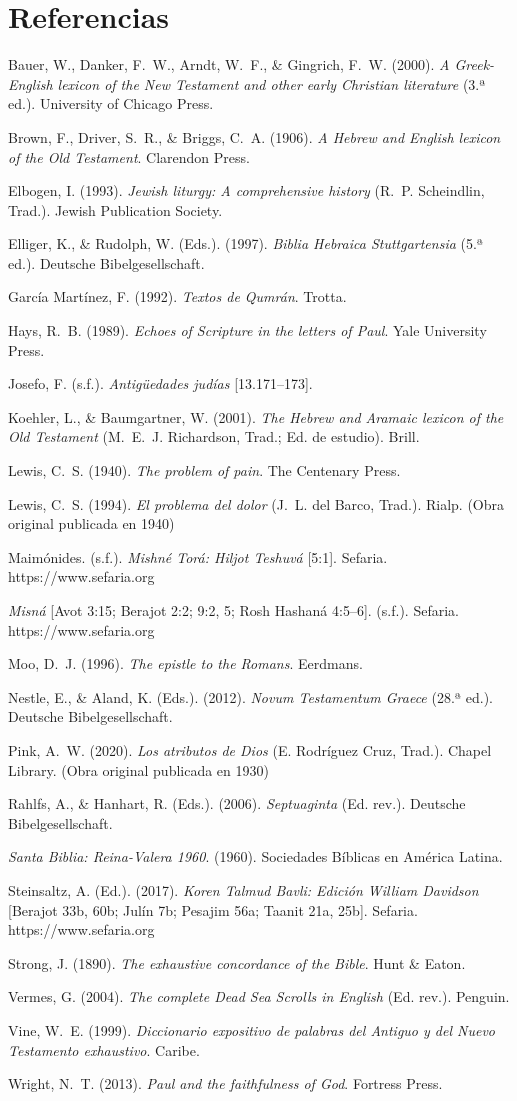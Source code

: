 \documentclass[11pt,letterpaper]{article}
\newcommand{\refapa}[1]{\par{\RaggedRight\hangindent=1.27cm\hangafter=1\noindent #1\par}\vspace{4pt}}
\begin{document}
\section*{Referencias}
\refapa{Bauer, W., Danker, F.~W., Arndt, W.~F., \& Gingrich, F.~W. (2000). \emph{A Greek-English lexicon of the New Testament and other early Christian literature} (3.ª ed.). University of Chicago Press.}
\refapa{Brown, F., Driver, S.~R., \& Briggs, C.~A. (1906). \emph{A Hebrew and English lexicon of the Old Testament}. Clarendon Press.}
\refapa{Elbogen, I. (1993). \emph{Jewish liturgy: A comprehensive history} (R.~P. Scheindlin, Trad.). Jewish Publication Society.}
\refapa{Elliger, K., \& Rudolph, W. (Eds.). (1997). \emph{Biblia Hebraica Stuttgartensia} (5.ª ed.). Deutsche Bibelgesellschaft.}
\refapa{García Martínez, F. (1992). \emph{Textos de Qumrán}. Trotta.}
\refapa{Hays, R.~B. (1989). \emph{Echoes of Scripture in the letters of Paul}. Yale University Press.}
\refapa{Josefo, F. (s.f.). \emph{Antigüedades judías} [13.171--173].}
\refapa{Koehler, L., \& Baumgartner, W. (2001). \emph{The Hebrew and Aramaic lexicon of the Old Testament} (M.~E.~J. Richardson, Trad.; Ed. de estudio). Brill.}
\refapa{Lewis, C.~S. (1940). \emph{The problem of pain}. The Centenary Press.}
\refapa{Lewis, C.~S. (1994). \emph{El problema del dolor} (J.~L. del Barco, Trad.). Rialp. (Obra original publicada en 1940)}
\refapa{Maimónides. (s.f.). \emph{Mishné Torá: Hiljot Teshuvá} [5:1]. Sefaria. https://www.sefaria.org}
\refapa{\emph{Misná} [Avot 3:15; Berajot 2:2; 9:2, 5; Rosh Hashaná 4:5--6]. (s.f.). Sefaria. https://www.sefaria.org}
\refapa{Moo, D.~J. (1996). \emph{The epistle to the Romans}. Eerdmans.}
\refapa{Nestle, E., \& Aland, K. (Eds.). (2012). \emph{Novum Testamentum Graece} (28.ª ed.). Deutsche Bibelgesellschaft.}
\refapa{Pink, A.~W. (2020). \emph{Los atributos de Dios} (E. Rodríguez Cruz, Trad.). Chapel Library. (Obra original publicada en 1930)}
\refapa{Rahlfs, A., \& Hanhart, R. (Eds.). (2006). \emph{Septuaginta} (Ed. rev.). Deutsche Bibelgesellschaft.}
\refapa{\emph{Santa Biblia: Reina-Valera 1960}. (1960). Sociedades Bíblicas en América Latina.}
\refapa{Steinsaltz, A. (Ed.). (2017). \emph{Koren Talmud Bavli: Edición William Davidson} [Berajot 33b, 60b; Julín 7b; Pesajim 56a; Taanit 21a, 25b]. Sefaria. https://www.sefaria.org}
\refapa{Strong, J. (1890). \emph{The exhaustive concordance of the Bible}. Hunt \& Eaton.}
\refapa{Vermes, G. (2004). \emph{The complete Dead Sea Scrolls in English} (Ed. rev.). Penguin.}
\refapa{Vine, W.~E. (1999). \emph{Diccionario expositivo de palabras del Antiguo y del Nuevo Testamento exhaustivo}. Caribe.}
\refapa{Wright, N.~T. (2013). \emph{Paul and the faithfulness of God}. Fortress Press.}
\end{document}
